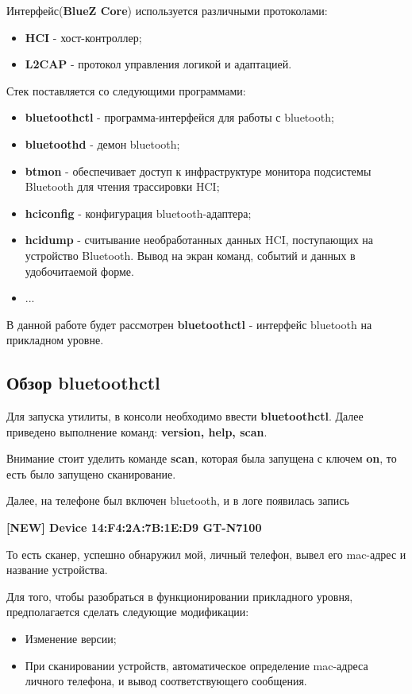 Интерфейс(\textbf{BlueZ Core}) используется различными протоколами:
\begin{itemize}
\item \textbf{HCI} - хост-контроллер;
\item \textbf{L2CAP} - протокол управления логикой и адаптацией.
\end{itemize}
Стек поставляется со следующими программами:
\begin{itemize}
\item \textbf{bluetoothctl} - программа-интерфейся для работы с bluetooth;
\item \textbf{bluetoothd} - демон bluetooth;
\item \textbf{btmon} - обеспечивает доступ к инфраструктуре монитора подсистемы Bluetooth для чтения трассировки HCI;
\item \textbf{hciconfig} - конфигурация bluetooth-адаптера;
\item \textbf{hcidump} - считывание необработанных данных HCI, поступающих на устройство Bluetooth. Вывод на экран команд, событий и данных в удобочитаемой форме.
\item ...
\end{itemize}
В данной работе будет рассмотрен \textbf{bluetoothctl} - интерфейс bluetooth на прикладном уровне.

\subsection{Обзор bluetoothctl}
Для запуска утилиты, в консоли необходимо ввести \textbf{bluetoothctl}. 
Далее приведено выполнение команд: \textbf{version, help, scan}.

Внимание стоит уделить команде \textbf{scan}, которая была запущена с ключем \textbf{on}, то есть было запущено сканирование.

Далее, на телефоне был включен bluetooth, и в логе появилась запись
\begin{center}
\textbf{[NEW] Device 14:F4:2A:7B:1E:D9 GT-N7100}
\end{center}
То есть сканер, успешно обнаружил мой, личный телефон, вывел его mac-адрес и название устройства.

Для того, чтобы разобраться в функционировании прикладного уровня, предполагается сделать следующие модификации:
\begin{itemize}
\item Изменение версии;
\item При сканировании устройств, автоматическое определение mac-адреса личного телефона, и вывод соответствующего сообщения.
\end{itemize}

